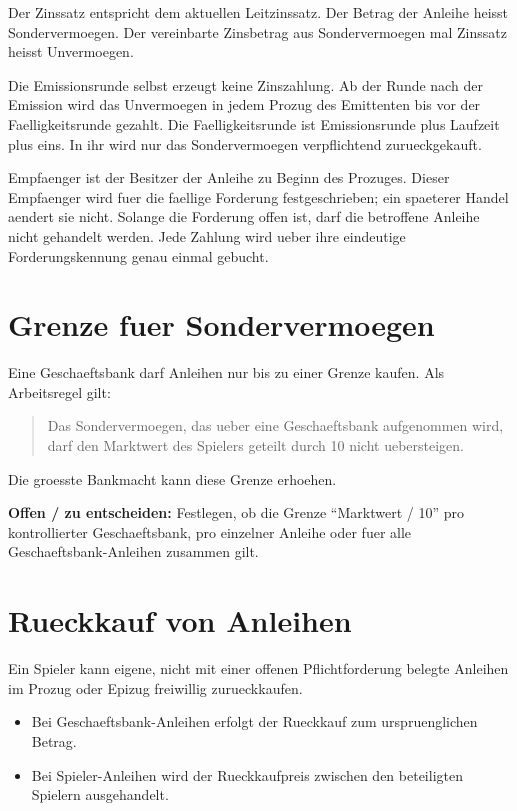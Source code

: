\documentclass[11pt,a4paper,oneside,parskip=half]{scrreprt}
\newcommand{\offen}[1]{\begin{framed}\noindent\textbf{Offen / zu entscheiden:} #1\end{framed}}
\begin{document}
Der Zinssatz entspricht dem aktuellen Leitzinssatz. Der Betrag der Anleihe heisst Sondervermoegen. Der vereinbarte Zinsbetrag aus Sondervermoegen mal Zinssatz heisst Unvermoegen.

Die Emissionsrunde selbst erzeugt keine Zinszahlung. Ab der Runde nach der Emission wird das Unvermoegen in jedem Prozug des Emittenten bis vor der Faelligkeitsrunde gezahlt. Die Faelligkeitsrunde ist Emissionsrunde plus Laufzeit plus eins. In ihr wird nur das Sondervermoegen verpflichtend zurueckgekauft.

Empfaenger ist der Besitzer der Anleihe zu Beginn des Prozuges. Dieser Empfaenger wird fuer die faellige Forderung festgeschrieben; ein spaeterer Handel aendert sie nicht. Solange die Forderung offen ist, darf die betroffene Anleihe nicht gehandelt werden. Jede Zahlung wird ueber ihre eindeutige Forderungskennung genau einmal gebucht.

\section{Grenze fuer Sondervermoegen}
Eine Geschaeftsbank darf Anleihen nur bis zu einer Grenze kaufen. Als Arbeitsregel gilt:

\begin{quote}
Das Sondervermoegen, das ueber eine Geschaeftsbank aufgenommen wird, darf den Marktwert des Spielers geteilt durch 10 nicht uebersteigen.
\end{quote}

Die groesste Bankmacht kann diese Grenze erhoehen.

\offen{Festlegen, ob die Grenze \enquote{Marktwert / 10} pro kontrollierter Geschaeftsbank, pro einzelner Anleihe oder fuer alle Geschaeftsbank-Anleihen zusammen gilt.}

\section{Rueckkauf von Anleihen}
Ein Spieler kann eigene, nicht mit einer offenen Pflichtforderung belegte Anleihen im Prozug oder Epizug freiwillig zurueckkaufen.

\begin{itemize}
  \item Bei Geschaeftsbank-Anleihen erfolgt der Rueckkauf zum urspruenglichen Betrag.
  \item Bei Spieler-Anleihen wird der Rueckkaufpreis zwischen den beteiligten Spielern ausgehandelt.
\end{itemize}
\end{document}
